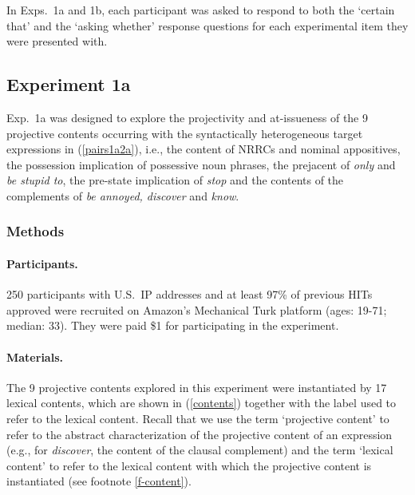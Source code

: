 \documentclass[11pt,fleqn]{article}
\newcommand{\6}{\mbox{$[\hspace*{-.6mm}[$}}
\newcommand{\9}{\mbox{$]\hspace*{-.6mm}]$}}
\begin{document}
In Exps.~1a and 1b, each participant was asked to respond to both the `certain that'  and the `asking whether' response questions for each experimental item they were presented with.

\subsection{Experiment 1a}\label{s-exp1a}

Exp.~1a was designed to explore the projectivity and at-issueness of the 9 projective contents occurring with the syntactically heterogeneous target expressions in (\ref{pairs1a2a}), i.e., the content of NRRCs and nominal appositives, the possession implication of possessive noun phrases, the prejacent of {\em only} and {\em be stupid to}, the pre-state implication of {\em stop} and the contents of the complements of {\em be annoyed, discover} and {\em know}.

\subsubsection{Methods}\label{s-methods-1a}

\paragraph{Participants.} 250 participants with U.S.\ IP addresses and at least 97\% of previous HITs approved were recruited on Amazon's Mechanical Turk platform (ages: 19-71; median: 33). They were paid \$1 for participating in the experiment. 

\paragraph{Materials.} The 9 projective contents explored in this experiment were instantiated by 17 lexical contents, which are shown in (\ref{contents}) together with the label used to refer to the lexical content. Recall that we use the term `projective content' to refer to the abstract characterization of the projective content of an expression (e.g., for {\em discover}, the content of the clausal complement) and the term `lexical content' to refer to the lexical content with which the projective content is instantiated (see footnote \ref{f-content}).
\end{document}
